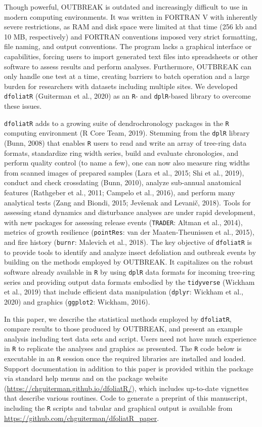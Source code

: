 \documentclass[review]{elsarticle} %
\begin{document}
Though powerful, OUTBREAK is outdated and increasingly difficult to use in modern computing environments. It was written in FORTRAN V with inherently severe restrictions, as RAM and disk space were limited at that time (256 kb and 10 MB, respectively) and FORTRAN conventions imposed very strict formatting, file naming, and output conventions. The program lacks a graphical interface or capabilities, forcing users to import generated text files into spreadsheets or other software to assess results and perform analyses. Furthermore, OUTBREAK can only handle one test at a time, creating barriers to batch operation and a large burden for researchers with datasets including multiple sites. We developed \texttt{dfoliatR} (Guiterman et al., 2020) as an \texttt{R}- and \texttt{dplR}-based library to overcome these issues.

\texttt{dfoliatR} adds to a growing suite of dendrochronology packages in the \texttt{R} computing environment (R Core Team, 2019). Stemming from the \texttt{dplR} library (Bunn, 2008) that enables \texttt{R} users to read and write an array of tree-ring data formats, standardize ring width series, build and evaluate chronologies, and perform quality control (to name a few), one can now also measure ring widths from scanned images of prepared samples (Lara et al., 2015; Shi et al., 2019), conduct and check crossdating (Bunn, 2010), analyze sub-annual anatomical features (Rathgeber et al., 2011; Campelo et al., 2016), and perform many analytical tests (Zang and Biondi, 2015; Jevšenak and Levanič, 2018). Tools for assessing stand dynamics and disturbance analyses are under rapid development, with new packages for assessing release events (\texttt{TRADER}: Altman et al., 2014), metrics of growth resilience (\texttt{pointRes}: van der Maaten-Theunissen et al., 2015), and fire history (\texttt{burnr}: Malevich et al., 2018). The key objective of \texttt{dfoliatR} is to provide tools to identify and analyze insect defoliation and outbreak events by building on the methods employed by OUTBREAK. It capitalizes on the robust software already available in \texttt{R} by using \texttt{dplR} data formats for incoming tree-ring series and providing output data formats embodied by the \texttt{tidyverse} (Wickham et al., 2019) that include efficient data manipulation (\texttt{dplyr}: Wickham et al., 2020) and graphics (\texttt{ggplot2}: Wickham, 2016).

In this paper, we describe the statistical methods employed by \texttt{dfoliatR}, compare results to those produced by OUTBREAK, and present an example analysis including test data sets and script. Users need not have much experience in \texttt{R} to replicate the analyses and graphics as presented. The \texttt{R} code below is executable in an \texttt{R} session once the required libraries are installed and loaded. Support documentation in addition to this paper is provided within the package via standard help menus and on the package website (\url{https://chguiterman.github.io/dfoliatR/}), which includes up-to-date vignettes that describe various routines. Code to generate a preprint of this manuscript, including the \texttt{R} scripts and tabular and graphical output is available from \url{https://github.com/chguiterman/dfoliatR_paper}.
\end{document}
